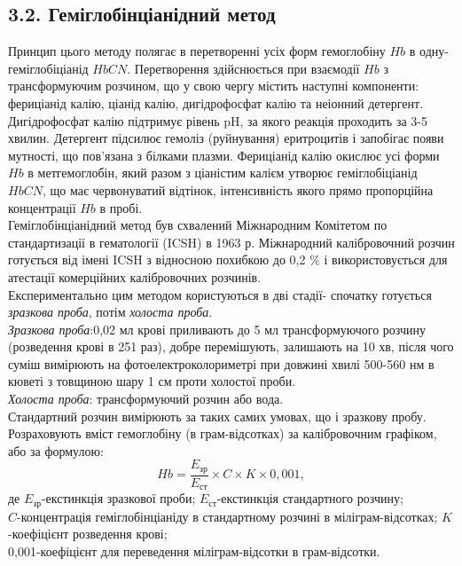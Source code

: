 \documentclass[14pt,a4paper]{scrartcl}
\begin{document}
\subsection*{3.2. Геміглобінціанідний метод}
Принцип цього методу полягає в перетворенні усіх форм гемоглобіну $Hb$ в одну- геміглобіціанід $HbCN$. \cite{l1} Перетворення здійснюється при взаємодії $Hb$ з трансформуючим розчином, що у свою чергу містить наступні компоненти: фериціанід калію, ціанід калію, дигідрофосфат калію та неіонний детергент. Дигідрофосфат калію підтримує рівень pH, за якого реакція проходить за 3-5 хвилин. Детергент підсилює гемоліз (руйнування) еритроцитів і запобігає появи мутності, що пов'язана з білками плазми. Фериціанід калію окислює усі форми $Hb$ в метгемоглобін, який разом з ціаністим калієм утворює геміглобіціанід $HbCN$, що має червонуватий відтінок, інтенсивність якого прямо пропорційна концентрації $Hb$ в пробі.\\

Геміглобінціанідний метод був схвалений Міжнародним Комітетом по стандартизації в гематології (ICSH) в 1963 р. Міжнародний калібровочний розчин готується від імені ICSH з відносною похибкою до 0,2 \% і використовується для атестації комерційних калібровочних розчинів.\\

Експериментально цим методом користуються в дві стадії- спочатку готується {\itshape зразкова проба}, потім {\itshape холоста проба}. \cite{l5} \\

{\itshape Зразкова проба}:0,02 мл крові приливають до 5 мл трансформуючого розчину (розведення крові в 251 раз), добре перемішують, залишають на 10 хв, після чого суміш вимірюють на фотоелектроколориметрі при довжині хвилі 500-560 нм в кюветі з товщиною шару 1 см проти холостої проби.\\

{\itshape Холоста проба}: трансформуючий розчин або вода.\\

Стандартний розчин вимірюють за таких самих умовах, що і зразкову пробу.
Розраховують вміст гемоглобіну (в грам-відсотках) за калібровочним графіком, або за формулою:
\begin{equation}
Hb=\dfrac{E_{\text{зр}}}{E_{\text{ст}}}\times{C}\times{K}\times{0,001},
\end{equation}
де $E_{\text{зр}}$-екстинкція зразкової проби; $E_{\text{ст}}$-екстинкція стандартного розчину;\\
$C$-концентрація геміглобінціаніду в стандартному розчині в міліграм-відсотках; $K$-коефіцієнт розведення крові;\\
0,001-коефіцієнт для переведення міліграм-відсотки в грам-відсотки.\\
\end{document}
